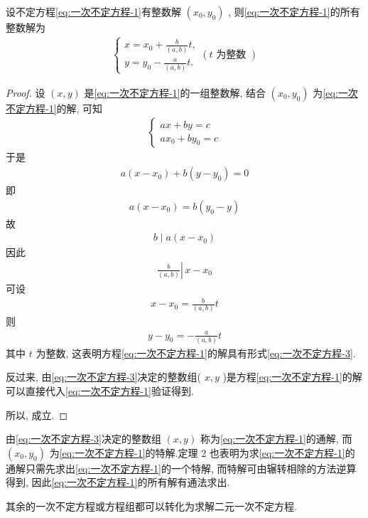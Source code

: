 \begin{theorem}\label{thm:一次不定方程-2}
	设不定方程\ref{eq:一次不定方程-1}有整数解 $\left(x_{0}, y_{0}\right)$ , 则\autoref{eq:一次不定方程-1}的所有整数解为
	\begin{align}\label{eq:一次不定方程-3}
		\left\{\begin{array}{l}
			       x=x_{0}+\frac{b}{(a, b)} t, \\
			       y=y_{0}-\frac{a}{(a, b)} t .
		       \end{array}(t \text { 为整数 })\right.
	\end{align}
\end{theorem}
\begin{proof}
	设 $(x, y)$ 是\autoref{eq:一次不定方程-1}的一组整数解, 结合 $\left(x_{0}, y_{0}\right)$ 为\autoref{eq:一次不定方程-1}的解, 可知
	\begin{align*}
		\left\{\begin{array}{l}
			       a x+b y=c \\
			       a x_{0}+b y_{0}=c
		       \end{array}\right.
	\end{align*}
	于是
	\begin{align*}
		a\left(x-x_{0}\right)+b\left(y-y_{0}\right)=0
	\end{align*}
	即
	\begin{align*}
		a\left(x-x_{0}\right)=b\left(y_{0}-y\right)
	\end{align*}
	故
	\begin{align*}
		b \mid a\left(x-x_{0}\right)
	\end{align*}
	因此
	\begin{align*}
		\left.\frac{b}{(a, b)} \right\rvert\, x-x_{0}
	\end{align*}
	可设
	\begin{align*}
		x-x_{0}=\frac{b}{(a, b)} t
	\end{align*}
	则
	\begin{align*}
		y-y_{0}=-\frac{a}{(a, b)} t
	\end{align*}
	其中 $t$ 为整数, 这表明方程\autoref{eq:一次不定方程-1}的解具有形式\autoref{eq:一次不定方程-3}.

	反过来, 由\autoref{eq:一次不定方程-3}决定的整数组( $x, y$ )是方程\autoref{eq:一次不定方程-1}的解可以直接代入\autoref{eq:一次不定方程-1}验证得到.

	所以, 成立.
\end{proof}
\begin{note}
	由\autoref{eq:一次不定方程-3}决定的整数组 $(x, y)$ 称为\autoref{eq:一次不定方程-1}的通解, 而 $\left(x_{0}, y_{0}\right)$ 为\autoref{eq:一次不定方程-1}的特解.定理 2 也表明为求\autoref{eq:一次不定方程-1}的通解只需先求出\autoref{eq:一次不定方程-1}的一个特解, 而特解可由辗转相除的方法逆算得到, 因此\autoref{eq:一次不定方程-1}的所有解有通法求出.

	其余的一次不定方程或方程组都可以转化为求解二元一次不定方程.
\end{note}

